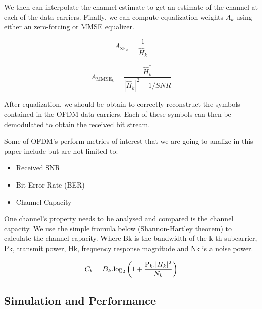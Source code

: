 \documentclass[conference]{IEEEtran}
\begin{document}
		We then can interpolate the channel estimate to get an estimate of the channel at each of the data carriers. Finally, we can compute equalization weights $A_k$ using either an zero-forcing or MMSE equalizer.
		
		\begin{equation}
			A_{\text{ZF}_k} = \frac{1}{\hat{H}_k}
		\end{equation}
		
		\begin{equation}
			A_{\text{MMSE}_k} = \frac{\hat{H}_k^{*}}{|\hat{H}_k|^2 + 1/SNR}
		\end{equation}
		
		After equalization, we should be obtain to correctly reconstruct the symbols contained in the OFDM data carriers. Each of these symbols can then be demodulated to obtain the received bit stream.
		
		
Some of OFDM's perform metrics of interest that we are going to analize in this paper include but are not limited to:

\begin{itemize}
\item Received SNR
\item Bit Error Rate (BER)
\item Channel Capacity
\end{itemize}

One channel's property needs to be analysed and compared is the channel capacity. We use the simple fromula below (Shannon-Hartley theorem) to calculate the channel capacity. 
Where Bk is the bandwidth of the k-th subcarrier, Pk, transmit power, Hk, frequency response magnitude and Nk is a noise power.   
	

			\begin{equation}
			C_{k} = B_{k}.\text{log}_2\left(1 +\frac{ \text P_{k}.|H_{k}|^2}{N_{k}}\right)
	    		\label{eq:ofdm_capacity}
	    		\end{equation}

\subsection {Simulation and Performance}
      
\end{document}
